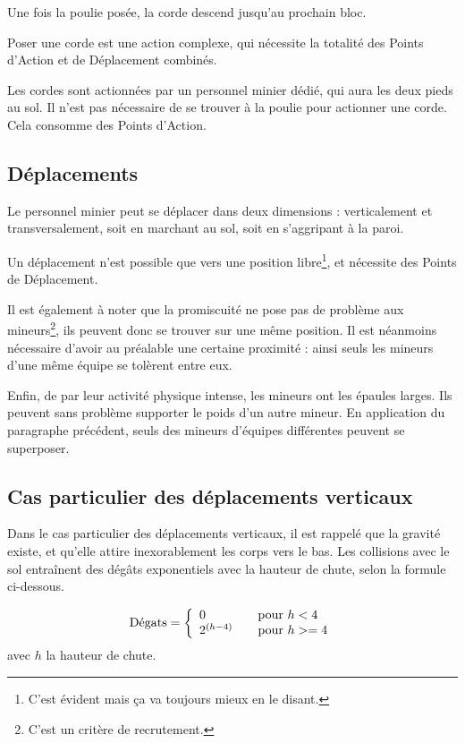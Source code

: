 Une fois la poulie posée, la corde descend jusqu'au prochain bloc.

Poser une corde est une action complexe, qui nécessite la totalité des Points d'Action et de Déplacement combinés.

Les cordes sont actionnées par un personnel minier dédié, qui aura les deux pieds au sol. Il n'est pas nécessaire de se trouver à la poulie pour actionner une corde. Cela consomme des Points d'Action.

\subsection{Déplacements}
Le personnel minier peut se déplacer dans deux dimensions : verticalement et transversalement, soit en marchant au sol, soit en s'aggripant à la paroi.

Un déplacement n'est possible que vers une position libre\footnote{C'est évident mais ça va toujours mieux en le disant.}, et nécessite des Points de Déplacement.

Il est également à noter que la promiscuité ne pose pas de problème aux mineurs\footnote{C'est un critère de recrutement.}, ils peuvent donc se trouver sur une même position. Il est néanmoins nécessaire d'avoir au préalable une certaine proximité : ainsi seuls les mineurs d'une même équipe se tolèrent entre eux.

Enfin, de par leur activité physique intense, les mineurs ont les épaules larges. Ils peuvent sans problème supporter le poids d'un autre mineur. En application du paragraphe précédent, seuls des mineurs d'équipes différentes peuvent se superposer.

\subsection{Cas particulier des déplacements verticaux}
Dans le cas particulier des déplacements verticaux, il est rappelé que la gravité existe, et qu'elle attire inexorablement les corps vers le bas. Les collisions avec le sol entraînent des dégâts exponentiels avec la hauteur de chute, selon la formule ci-dessous.

\[
\text{Dégats} = 
\left\{
        \begin{array}{l l}
        0 & \quad \text{pour $h < 4$}\\
        2^{(h-4)} & \quad \text{pour $h >= 4$}\\
        \end{array}
\right. \]
avec $h$ la hauteur de chute.

